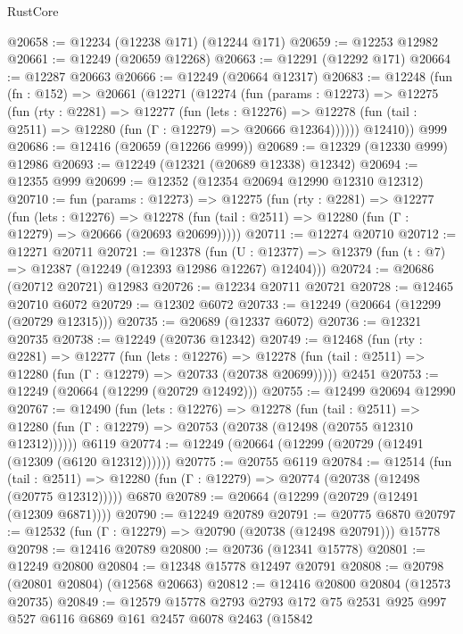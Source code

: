 \begin{lexlean}{RustCore}
\begin{coremodule}
@20658 := @12234 (@12238 @171) (@12244 @171)
@20659 := @12253 @12982
@20661 := @12249 (@20659 @12268)
@20663 := @12291 (@12292 @171)
@20664 := @12287 @20663
@20666 := @12249 (@20664 @12317)
@20683 := @12248
    (fun (fn : @152) =>
    @20661
      (@12271
        (@12274
          (fun (params : @12273) =>
          @12275
            (fun (rty : @2281) =>
            @12277
              (fun (lets : @12276) =>
              @12278 (fun (tail : @2511) => @12280 (fun (Γ : @12279) => @20666 @12364))))))
        @12410))
    @999
@20686 := @12416 (@20659 (@12266 @999))
@20689 := @12329 (@12330 @999) @12986
@20693 := @12249 (@12321 (@20689 @12338) @12342)
@20694 := @12355 @999
@20699 := @12352 (@12354 @20694 @12990 @12310 @12312)
@20710 := fun (params : @12273) =>
  @12275
    (fun (rty : @2281) =>
    @12277
      (fun (lets : @12276) =>
      @12278 (fun (tail : @2511) => @12280 (fun (Γ : @12279) => @20666 (@20693 @20699)))))
@20711 := @12274 @20710
@20712 := @12271 @20711
@20721 := @12378
    (fun (U : @12377) => @12379 (fun (t : @7) => @12387 (@12249 (@12393 @12986 @12267) @12404)))
@20724 := @20686 (@20712 @20721) @12983
@20726 := @12234 @20711 @20721
@20728 := @12465 @20710 @6072
@20729 := @12302 @6072
@20733 := @12249 (@20664 (@12299 (@20729 @12315)))
@20735 := @20689 (@12337 @6072)
@20736 := @12321 @20735
@20738 := @12249 (@20736 @12342)
@20749 := @12468
    (fun (rty : @2281) =>
    @12277
      (fun (lets : @12276) =>
      @12278 (fun (tail : @2511) => @12280 (fun (Γ : @12279) => @20733 (@20738 @20699)))))
    @2451
@20753 := @12249 (@20664 (@12299 (@20729 @12492)))
@20755 := @12499 @20694 @12990
@20767 := @12490
    (fun (lets : @12276) =>
    @12278
      (fun (tail : @2511) =>
      @12280 (fun (Γ : @12279) => @20753 (@20738 (@12498 (@20755 @12310 @12312))))))
    @6119
@20774 := @12249 (@20664 (@12299 (@20729 (@12491 (@12309 (@6120 @12312))))))
@20775 := @20755 @6119
@20784 := @12514
    (fun (tail : @2511) => @12280 (fun (Γ : @12279) => @20774 (@20738 (@12498 (@20775 @12312)))))
    @6870
@20789 := @20664 (@12299 (@20729 (@12491 (@12309 @6871))))
@20790 := @12249 @20789
@20791 := @20775 @6870
@20797 := @12532 (fun (Γ : @12279) => @20790 (@20738 (@12498 @20791))) @15778
@20798 := @12416 @20789
@20800 := @20736 (@12341 @15778)
@20801 := @12249 @20800
@20804 := @12348 @15778 @12497 @20791
@20808 := @20798 (@20801 @20804) (@12568 @20663)
@20812 := @12416 @20800 @20804 (@12573 @20735)
@20849 := @12579
    @15778
    @2793
    @2793
    @172
    @75
    @2531
    @925
    @997
    @527
    @6116
    @6869
    @161
    @2457
    @6078
    @2463
    (@15842

\end{coremodule}
\end{lexlean}
